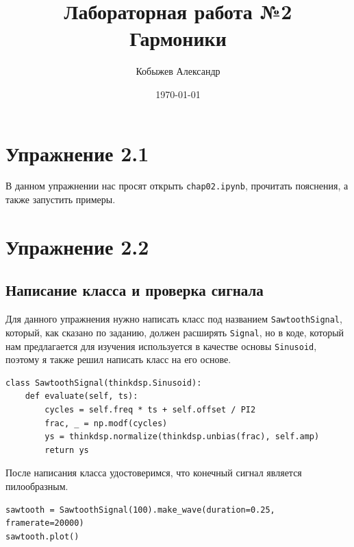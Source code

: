 \documentclass[a4paper,12pt]{report}
\title{Лабораторная работа №2\\Гармоники}
\author{Кобыжев Александр}
\date{\today}
\begin{document}
\maketitle
\tableofcontents
\listoffigures
\lstlistoflistings

\maketitle

\chapter{Упражнение 2.1}

В данном упражнении нас просят открыть \texttt{chap02.ipynb}, прочитать пояснения, а также запустить примеры.

\chapter{Упражнение 2.2}
\section{Написание класса и проверка сигнала}

Для данного упражнения нужно написать класс под названием \texttt{SawtoothSignal}, который, как сказано по заданию, должен расширять \texttt{Signal}, но в коде, который нам предлагается для изучения используется в качестве основы \texttt{Sinusoid}, поэтому я также решил написать класс на его основе.

\begin{lstlisting}[caption=Класс SawtoothSignal]
class SawtoothSignal(thinkdsp.Sinusoid):    
    def evaluate(self, ts):
        cycles = self.freq * ts + self.offset / PI2
        frac, _ = np.modf(cycles)
        ys = thinkdsp.normalize(thinkdsp.unbias(frac), self.amp)
        return ys
\end{lstlisting}

После написания класса удостоверимся, что конечный сигнал является пилообразным.

\begin{lstlisting}[caption=Визуализация пилообразного звука]
sawtooth = SawtoothSignal(100).make_wave(duration=0.25, framerate=20000)
sawtooth.plot()
\end{lstlisting}
\end{document}
